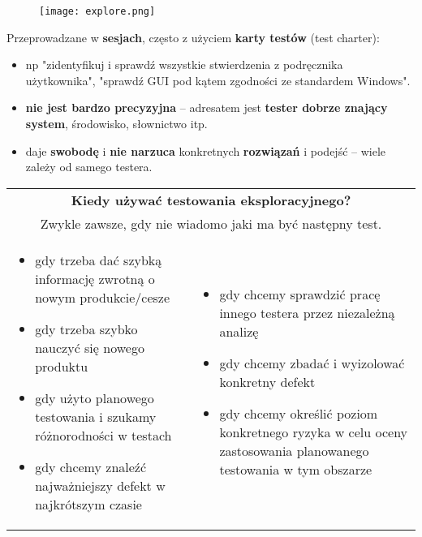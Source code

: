 \documentclass[../main.tex]{subfiles}
\begin{document}
    \begin{figure}[H]
        \texttt{[image: explore.png]}
    \end{figure}

    Przeprowadzane w \textbf{sesjach}, często z użyciem \textbf{karty testów} (test charter):
    \begin{itemize}
        \item np "zidentyfikuj i sprawdź
        wszystkie stwierdzenia z podręcznika użytkownika", "sprawdź GUI pod kątem zgodności ze standardem Windows".
        \item \textbf{nie jest bardzo precyzyjna} – adresatem jest \textbf{tester dobrze znający system}, środowisko,
        słownictwo itp.
        \item daje \textbf{swobodę} i \textbf{nie narzuca} konkretnych \textbf{rozwiązań} i podejść – wiele zależy od samego testera.
    \end{itemize}

    \begin{table}[H]
        \begin{center}
            \begin{tabular}{p{8cm} p{8cm}}
                \multicolumn{2}{c}{\textbf{Kiedy używać testowania eksploracyjnego?}}\\
                \multicolumn{2}{c}{Zwykle zawsze, gdy nie wiadomo jaki ma być następny test.}\\
                \begin{itemize}
                    \item gdy trzeba dać szybką informację zwrotną o nowym produkcie/cesze
                    \item gdy trzeba szybko nauczyć się nowego produktu
                    \item gdy użyto planowego testowania i szukamy różnorodności w testach
                    \item gdy chcemy znaleźć najważniejszy defekt w najkrótszym czasie
                \end{itemize}
                &
                \begin{itemize}
                    \item gdy chcemy sprawdzić pracę innego testera przez niezależną analizę
                    \item gdy chcemy zbadać i wyizolować konkretny defekt
                    \item gdy chcemy określić poziom konkretnego ryzyka w celu oceny zastosowania planowanego testowania w tym obszarze
                \end{itemize}
            \end{tabular}
        \end{center}
    \end{table}
\end{document}
